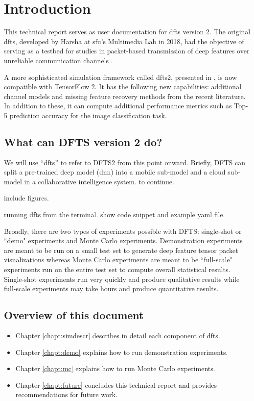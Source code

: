 \chapter{Introduction} \label{chapter:intro}
This technical report serves as user documentation for \gls{dfts} version 2. The original \gls{dfts}, developed by Harsha at \gls{sfu}'s Multimedia Lab in 2018, had the objective of serving as a testbed for studies in packet-based transmission of deep features over unreliable communication channels \cite{unnibhavi2018dfts}.

A more sophisticated simulation framework called \gls{dfts}2, presented in \cite{DFTS2_VCIP_2021}, is now compatible with TensorFlow 2. It has the following new capabilities: additional channel models and missing feature recovery methods from the recent literature. In addition to these, it can compute additional performance metrics such as Top-5 prediction accuracy for the image classification task.

\section{What can DFTS version 2 do?}
We will use ``\gls{dfts}'' to refer to DFTS2 from this point onward. Briefly, DFTS can split a pre-trained deep model (\gls{dnn}) into a mobile sub-model and a cloud sub-model in a collaborative intelligence system. to continue.

include figures.

running dfts from the terminal. show code snippet and example yaml file.

Broadly, there are two types of experiments possible with DFTS: single-shot or ``demo" experiments and Monte Carlo experiments. Demonstration experiments are meant to be run on a small test set to generate deep feature tensor packet visualizations whereas Monte Carlo experiments are meant to be ``full-scale" experiments run on the entire test set to compute overall statistical results. Single-shot experiments run very quickly and produce qualitative results while full-scale experiments may take hours and produce quantitative results.


\section{Overview of this document}
\begin{itemize}
	\item Chapter \ref{chapt:simdescr} describes in detail each component of \gls{dfts}.
	\item Chapter \ref{chapt:demo} explains how to run demonstration experiments.
	\item Chapter \ref{chapt:mc} explains how to run Monte Carlo experiments.
	\item Chapter \ref{chapt:future} concludes this technical report and provides recommendations for future work.
\end{itemize}

